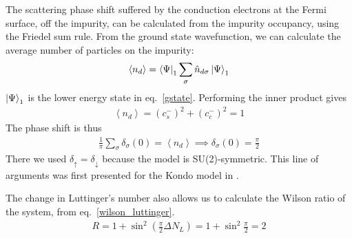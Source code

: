 \documentclass[10pt]{report}
\numberwithin{equation}{section}
\begin{document}
The scattering phase shift suffered by the conduction electrons at the Fermi surface, off the impurity, can be calculated from the impurity occupancy, using the Friedel sum rule. From the ground state wavefunction, we can calculate the average number of particles on the impurity:
\begin{equation}\begin{aligned}
	\left<n_d \right> = \bra{\Psi}_1\sum_\sigma \hat n_{d\sigma} \ket{\Psi}_1
\end{aligned}\end{equation}
\(\ket{\Psi}_1\) is the lower energy state in eq.~\eqref{gstate}. Performing the inner product gives
\begin{equation}\begin{aligned}
	\left<n_d \right> = \left( c_s^- \right)^2 + \left( c_c^- \right)^2 = 1
\end{aligned}\end{equation}
The phase shift is thus
\begin{equation}\begin{aligned}
	\frac{1}{\pi}\sum_\sigma \delta_\sigma(0) = \left<n_d \right> \implies \delta_\sigma(0) = \frac{\pi}{2}
\end{aligned}\end{equation}
There we used \(\delta_\uparrow = \delta_\downarrow\) because the model is SU(2)-symmetric. This line of arguments was first presented for the Kondo model in \cite{martin1982fermi}.

The change in Luttinger's number also allows us to calculate the Wilson ratio of the system, from eq.~\eqref{wilson_luttinger}.
\begin{equation}\begin{aligned}
	R = 1 + \sin^2 \left( \frac{\pi}{2}\Delta N_L \right) = 1 + \sin^2 \frac{\pi}{2} = 2
\end{aligned}\end{equation}
\end{document}
